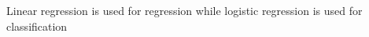 \documentclass[preview]{standalone}
\begin{document}
\begin{center}
Linear regression is used for regression while logistic regression is used for classification
\end{center}
\end{document}
